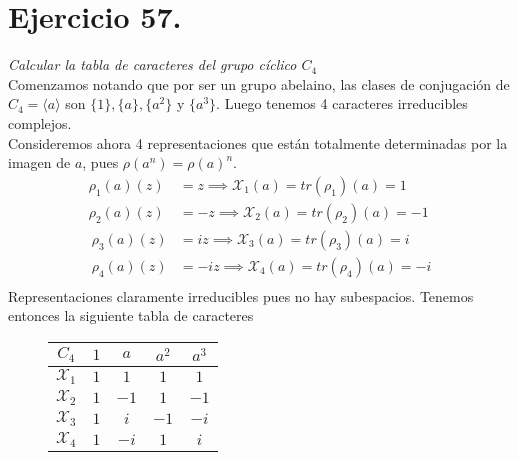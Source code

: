 \section{Ejercicio 57. }\emph{ Calcular la tabla de caracteres del grupo cíclico \(C_{4}\)}\\

Comenzamos notando que por ser un grupo abelaino, las clases de conjugación de \(C_{4} = \langle a \rangle\)  son \(\{1\}, \{a\}, \{a^{2}\}\) y \(\{a^{3}\}\). Luego tenemos 4 caracteres irreducibles complejos.\\

Consideremos ahora 4 representaciones que están totalmente determinadas por la imagen de \(a\), pues \(\rho(a^{n}) = \rho(a)^{n}\).
\[
  \begin{aligned}
    \rho_{1}(a)(z) &= z \implies \mathcal{X}_{1}(a) = tr(\rho_{1})(a) = 1\\
    \rho_{2}(a)(z) &= -z \implies \mathcal{X}_{2}(a) = tr(\rho_{2})(a) = -1\\\
    \rho_{3}(a)(z) &= iz \implies \mathcal{X}_{3}(a) = tr(\rho_{3})(a) = i\\\
    \rho_{4}(a)(z) &= -iz \implies \mathcal{X}_{4}(a) = tr(\rho_{4})(a) = -i\\\
  \end{aligned}
\]
Representaciones claramente irreducibles pues no hay subespacios. Tenemos entonces la siguiente tabla de caracteres

\begin{figure}[H]
  \centering
    \begin{tabular}{c|cccc}
      \(C_{4}\)  & \(1\)  & \(a\)  & \(a^{2}\) & \(a^{3}\)  \\ \hline
      \(\mathcal{X}_{1}\) & \(1\)   &  \(1\)    &     \(1\)      &     \(1\)       \\
      \(\mathcal{X}_{2}\) & \(1\)   &  \(-1\)  &     \(1\)      &     \(-1\)       \\
      \(\mathcal{X}_{3}\) & \(1\)   &   \(i\)    &     \(-1\)      &     \(-i\)       \\
      \(\mathcal{X}_{4}\) & \(1\)   &   \(-i\)   &     \(1\)      &     \(i\)       \\
    \end{tabular}
\end{figure}

